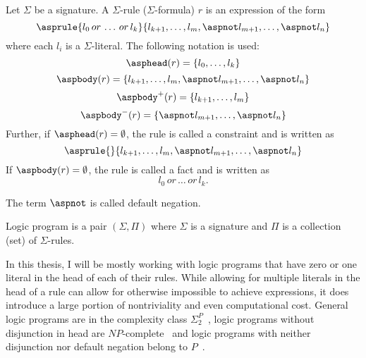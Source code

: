 \begin{definition}\label{def:rule}
    Let $\Sigma$ be a signature. A $\Sigma$-rule ($\Sigma$-formula) $r$ is an expression of the form
    \begin{equation*}
        \asprule{l_0\, or\, \ldots\, or\, l_k}{l_{k+1}, \ldots, l_{m}, \aspnot l_{m+1}, \ldots, \aspnot l_{n}}
    \end{equation*}
    where each $l_i$ is a $\Sigma$-literal. The following notation is used:
    \begin{equation*}
        \asphead(r) = \{l_0, \ldots, l_k\}
    \end{equation*}
    \begin{equation*}
        \aspbody(r) = \{l_{k+1}, \ldots, l_{m}, \aspnot l_{m+1}, \ldots, \aspnot l_n\}
    \end{equation*}
    \begin{equation*}
        \aspbody^+(r) = \{l_{k+1}, \ldots, l_{m}\}
    \end{equation*}
    \begin{equation*}
        \aspbody^-(r) = \{\aspnot l_{m+1}, \ldots, \aspnot l_n\}
    \end{equation*}
    Further, if $\asphead(r) = \emptyset$, the rule is called a constraint and is written as
    \begin{equation*}
        \asprule{}{l_{k+1}, \ldots, l_{m}, \aspnot l_{m+1}, \ldots, \aspnot l_{n}}
    \end{equation*}
    If $\aspbody(r) = \emptyset$, the rule is called a fact and is written as
    \begin{equation*}
        l_0\, or\, \ldots\, or\, l_k.
    \end{equation*}

    The term $\aspnot$ is called default negation.
\end{definition}

\begin{definition}
    Logic program is a pair $(\Sigma, \Pi)$ where $\Sigma$ is a signature
    and $\Pi$ is a collection (set) of $\Sigma$-rules.
\end{definition}

In this thesis, I will be mostly working with logic programs that have
zero or one literal in the head of each of their rules.
While allowing for multiple literals in the head of a rule can allow
for otherwise impossible to achieve expressions, it does introduce
a large portion of nontriviality and even computational cost.
General logic programs are in the complexity class $\Sigma_2^P$~\cite{dis_datalog_complexity},
logic programs without disjunction in head are $NP$-complete~\cite{schlipf1995_computation}
and logic programs with neither disjunction nor default negation belong to $P$~\cite{KRHandbook}.

